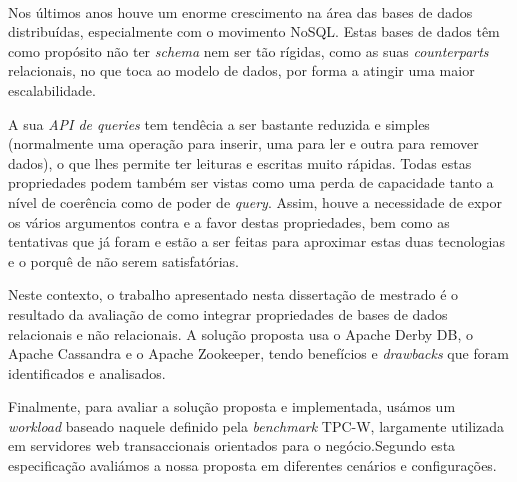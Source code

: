 
\paragraph{}


Nos últimos anos houve um enorme crescimento na área das bases de dados distribuídas, especialmente com o movimento NoSQL. Estas bases de dados têm  como propósito não ter \emph{schema} nem ser tão rígidas, como as suas \emph{counterparts} relacionais, no que toca ao modelo de dados, por forma a atingir uma maior escalabilidade.

A sua \emph{API de queries} tem tendêcia a ser bastante reduzida e simples (normalmente uma operação para inserir, uma para ler e outra para remover dados), o que lhes permite ter leituras e escritas muito rápidas. Todas estas propriedades podem também ser vistas como uma perda de capacidade tanto a nível de coerência como de poder de \emph{query}. Assim, houve a necessidade de expor os vários argumentos contra e a favor destas propriedades, bem como as tentativas que já foram e estão a ser feitas para aproximar estas duas tecnologias e o porquê de não serem satisfatórias.

Neste contexto, o trabalho apresentado nesta dissertação de mestrado é o resultado da avaliação de como integrar propriedades de bases de dados relacionais e não relacionais. A solução proposta usa o Apache Derby DB, o Apache Cassandra e o Apache Zookeeper, tendo benefícios e \emph{drawbacks} que foram identificados e analisados.

Finalmente, para avaliar a solução proposta e implementada, usámos um \emph{workload} baseado naquele definido pela \emph{benchmark} TPC-W, largamente utilizada em servidores web transaccionais orientados para o negócio.Segundo esta especificação avaliámos a nossa proposta em diferentes cenários e configurações.


